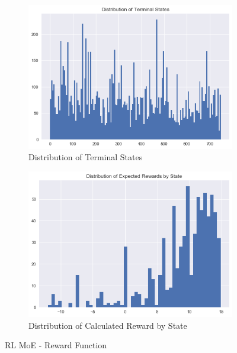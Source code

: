 \documentclass[letterpaper]{article}
\begin{document}
\begin{figure}[H]
  \centering
  \begin{subfigure}{0.5\linewidth}
  \centering
  	\includegraphics[width=1.0\linewidth]{figures/reward_by_state.png} %
  	\caption{Distribution of Terminal States}
  \end{subfigure}%
  \begin{subfigure}{0.5\linewidth}
  \centering
  	\includegraphics[width=1.0\linewidth]{figures/expected_reward.png}\hfill
  	\caption{Distribution of Calculated Reward by State}
	\label{fig:expected_reward}
  \end{subfigure}
  \caption{RL MoE - Reward Function}
\end{figure}

\end{document}
